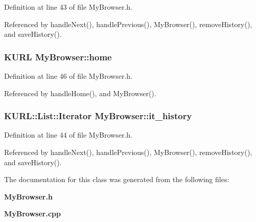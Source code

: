 Definition at line 43 of file My\-Browser.h.

Referenced by handle\-Next(), handle\-Previous(), My\-Browser(), remove\-History(), and save\-History().
\subsubsection{\setlength{\rightskip}{0pt plus 5cm}KURL {\bf My\-Browser::home}}\label{classMyBrowser_MyBrowsero3}




Definition at line 46 of file My\-Browser.h.

Referenced by handle\-Home(), and My\-Browser().
\subsubsection{\setlength{\rightskip}{0pt plus 5cm}KURL::List::Iterator {\bf My\-Browser::it\_\-history}}\label{classMyBrowser_MyBrowsero1}




Definition at line 44 of file My\-Browser.h.

Referenced by handle\-Next(), handle\-Previous(), My\-Browser(), remove\-History(), and save\-History().

The documentation for this class was generated from the following files:\begin{CompactItemize}
\item 
{\bf My\-Browser.h}\item 
{\bf My\-Browser.cpp}\end{CompactItemize}
